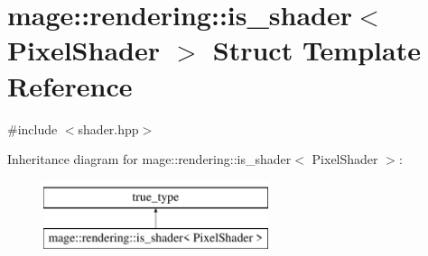 \hypertarget{structmage_1_1rendering_1_1is__shader_3_01_pixel_shader_01_4}{}\section{mage\+:\+:rendering\+:\+:is\+\_\+shader$<$ Pixel\+Shader $>$ Struct Template Reference}
\label{structmage_1_1rendering_1_1is__shader_3_01_pixel_shader_01_4}


{\ttfamily \#include $<$shader.\+hpp$>$}

Inheritance diagram for mage\+:\+:rendering\+:\+:is\+\_\+shader$<$ Pixel\+Shader $>$\+:\begin{figure}[H]
\begin{center}
\leavevmode
\includegraphics[height=2.000000cm]{structmage_1_1rendering_1_1is__shader_3_01_pixel_shader_01_4}
\end{center}
\end{figure}
